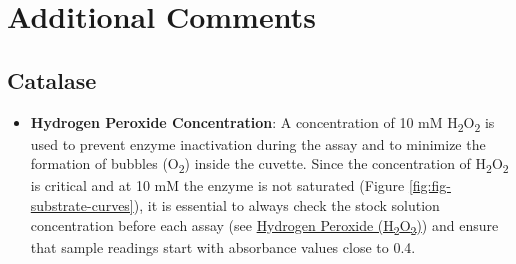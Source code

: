 \documentclass[
  9pt,
  american,
  a5paper,
  extrafontsizes,onecolumn,openright
  ]{memoir}
\providecommand{\tightlist}{%
  \setlength{\itemsep}{0pt}\setlength{\parskip}{0pt}}
\begin{document}
\normalsize

\section{Additional Comments}\label{cat_additional_comments}



\subsection{Catalase}\label{catalase-1}

\begin{itemize}
\tightlist
\item
  \textbf{Hydrogen Peroxide Concentration}: A concentration of 10 mM H\textsubscript{2}O\textsubscript{2} is used to prevent enzyme inactivation during the assay and to minimize the formation of bubbles (O\textsubscript{2}) inside the cuvette. Since the concentration of H\textsubscript{2}O\textsubscript{2} is critical and at 10 mM the enzyme is not saturated (Figure \ref{fig:fig-substrate-curves}), it is essential to always check the stock solution concentration before each assay (see \hyperref[checking_h2o2]{Hydrogen Peroxide (H\textsubscript{2}O\textsubscript{2})}) and ensure that sample readings start with absorbance values close to 0.4.
\end{itemize}

\scriptsize
\end{document}
